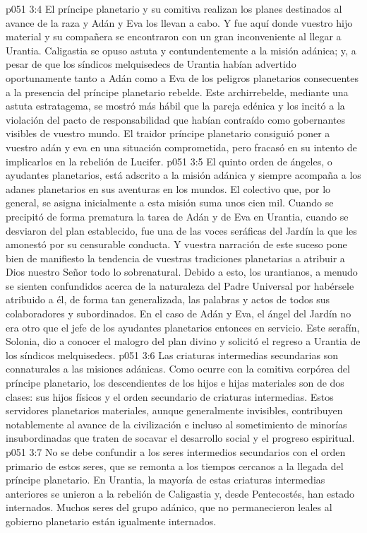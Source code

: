 \vs p051 3:4 El príncipe planetario y su comitiva realizan los planes destinados al avance de la raza y Adán y Eva los llevan a cabo. Y fue aquí donde vuestro hijo material y su compañera se encontraron con un gran inconveniente al llegar a Urantia. Caligastia se opuso astuta y contundentemente a la misión adánica; y, a pesar de que los síndicos melquisedecs de Urantia habían advertido oportunamente tanto a Adán como a Eva de los peligros planetarios consecuentes a la presencia del príncipe planetario rebelde. Este archirrebelde, mediante una astuta estratagema, se mostró más hábil que la pareja edénica y los incitó a la violación del pacto de responsabilidad que habían contraído como gobernantes visibles de vuestro mundo. El traidor príncipe planetario consiguió poner a vuestro adán y eva en una situación comprometida, pero fracasó en su intento de implicarlos en la rebelión de Lucifer.
\vs p051 3:5 \pc El quinto orden de ángeles, o ayudantes planetarios, está adscrito a la misión adánica y siempre acompaña a los adanes planetarios en sus aventuras en los mundos. El colectivo que, por lo general, se asigna inicialmente a esta misión suma unos cien mil. Cuando se precipitó de forma prematura la tarea de Adán y de Eva en Urantia, cuando se desviaron del plan establecido, fue una de las voces seráficas del Jardín la que les amonestó por su censurable conducta. Y vuestra narración de este suceso pone bien de manifiesto la tendencia de vuestras tradiciones planetarias a atribuir a Dios nuestro Señor todo lo sobrenatural. Debido a esto, los urantianos, a menudo se sienten confundidos acerca de la naturaleza del Padre Universal por habérsele atribuido a él, de forma tan generalizada, las palabras y actos de todos sus colaboradores y subordinados. En el caso de Adán y Eva, el ángel del Jardín no era otro que el jefe de los ayudantes planetarios entonces en servicio. Este serafín, Solonia, dio a conocer el malogro del plan divino y solicitó el regreso a Urantia de los síndicos melquisedecs.
\vs p051 3:6 \pc Las criaturas intermedias secundarias son connaturales a las misiones adánicas. Como ocurre con la comitiva corpórea del príncipe planetario, los descendientes de los hijos e hijas materiales son de dos clases: sus hijos físicos y el orden secundario de criaturas intermedias. Estos servidores planetarios materiales, aunque generalmente invisibles, contribuyen notablemente al avance de la civilización e incluso al sometimiento de minorías insubordinadas que traten de socavar el desarrollo social y el progreso espiritual.
\vs p051 3:7 No se debe confundir a los seres intermedios secundarios con el orden primario de estos seres, que se remonta a los tiempos cercanos a la llegada del príncipe planetario. En Urantia, la mayoría de estas criaturas intermedias anteriores se unieron a la rebelión de Caligastia y, desde Pentecostés, han estado internados. Muchos seres del grupo adánico, que no permanecieron leales al gobierno planetario están igualmente internados.

